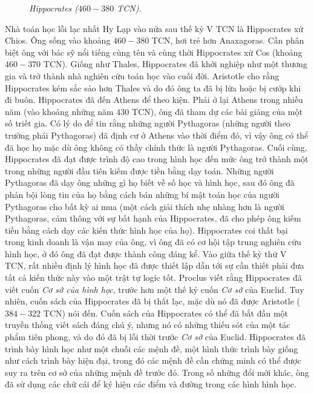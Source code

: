 \begin{multicols}{2}
\begin{figure}[H]
		\caption{\small\textit{\color{lichsutoanhoc}Hippocrates ($460-380$ TCN).}}
		\vspace*{-10pt}
	\end{figure}
	Nhà toán học lỗi lạc nhất Hy Lạp vào nửa sau thế kỷ V TCN là Hippocrates xứ Chios. Ông sống vào khoảng $460-380$ TCN,  hơi trẻ hơn Anaxagoras. Cần phân biệt ông  với bác sỹ nổi tiếng cùng tên và cùng thời Hippocrates xứ Cos (khoảng $460-370$ TCN). Giống như Thales, Hippocrates đã khởi nghiệp như một thương gia và trở thành nhà nghiên cứu toán học vào cuối đời. Aristotle cho rằng Hippocrates kém sắc sảo hơn Thales và do đó ông ta đã bị lừa hoặc bị cướp khi đi buôn. Hippocrates đã đến Athens để theo kiện. Phải ở lại Athens trong nhiều năm (vào khoảng những năm $430$ TCN), ông đã tham dự các bài giảng của một số triết gia. Có lý do để tin rằng những người Pythagoras (những người theo trường phái Pythagoras) đã định cư ở Athens vào thời điểm đó, vì vậy ông có thể đã học họ mặc dù ông không có thầy chính thức là người Pythagoras. Cuối cùng, Hippocrates đã đạt được trình độ cao trong hình học đến mức ông trở thành một trong những người đầu tiên kiếm được tiền bằng dạy toán. Những người Pythagoras đã dạy ông những gì họ biết về số học và hình học, sau đó ông đã phản bội lòng tin của họ bằng cách bán những bí mật toán học của người Pythagoras cho bất kỳ ai mua (một cách giải thích nhẹ nhàng hơn là người Pythagoras, cảm thông với sự bất hạnh của Hippocrates, đã cho phép ông kiếm tiền bằng cách dạy các kiến thức hình học của họ).
	\vskip 0.05cm
	Hippocrates coi thất bại trong kinh doanh là vận may của ông, vì ông đã có cơ hội tập trung nghiên cứu hình học, ở đó ông đã đạt được thành công đáng kể. 
	\vskip 0.05cm
	Vào giữa thế kỷ thứ V TCN, rất nhiều định lý hình học đã được thiết lập dẫn tới sự cần thiết phải đưa tất cả kiến thức này vào một trật tự logic tốt. Proclus viết rằng Hippocrates đã viết cuốn  \textit{Cơ sở của hình học}, trước hơn một thế kỷ cuốn \textit{Cơ sở}  của Euclid. Tuy nhiên, cuốn sách của Hippocrates đã bị thất lạc, mặc dù nó đã được Aristotle ($384-322$ TCN) nói đến. Cuốn sách của Hippocrates có thể đã bắt đầu một truyền thống viết sách đáng chú ý, nhưng nó có những thiếu sót của một tác phẩm tiên phong, và do đó đã bị lỗi thời trước \textit{Cơ sở} của Euclid.
	\vskip 0.05cm
	Hippocrates đã trình bày hình học như một chuỗi các mệnh đề, một hình thức trình bày giống như cách trình bày hiện đại, trong đó các mệnh đề cần chứng minh có thể được suy ra trên cơ sở của những mệnh đề trước đó. Trong số những đổi mới khác, ông đã sử dụng các chữ cái để ký hiệu các điểm và đường trong các hình hình học.

\end{multicols}
